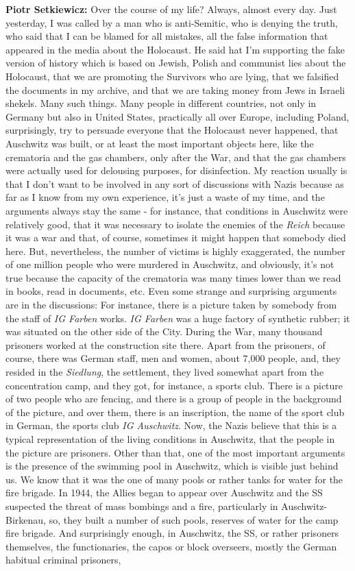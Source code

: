 \textbf{Piotr Setkiewicz:} Over the course of my life? Always, almost every day. Just yesterday, I was called by a man who is anti-Semitic, who is denying the truth, who said that I can be blamed for all mistakes, all the false information that appeared in the media about the Holocaust. He said hat I'm supporting the fake version of history which is based on Jewish, Polish and communist lies about the Holocaust, that we are promoting the Survivors who are lying, that we falsified the documents in my archive, and that we are taking money from Jews in Israeli shekels. Many such things. Many people in different countries, not only in Germany but also in United States, practically all over Europe, including Poland, surprisingly, try to persuade everyone that the Holocaust never happened, that Auschwitz was built, or at least the most important objects here, like the crematoria and the gas chambers, only after the War, and that the gas chambers were actually used for delousing purposes, for disinfection. My reaction usually is that I don't want to be involved in any sort of discussions with Nazis because as far as I know from my own experience, it's just a waste of my time, and the arguments always stay the same - for instance, that conditions in Auschwitz were relatively good, that it was necessary to isolate the enemies of the \textit{Reich} because it was a war and that, of course, sometimes it might happen that somebody died here. But, nevertheless, the number of victims is highly exaggerated, the number of one million people who were murdered in Auschwitz, and obviously, it's not true because the capacity of the crematoria was many times lower than we read in books, read in documents, etc. Even some strange and surprising arguments are in the discussions: For instance, there is a picture taken by somebody from the staff of \textit{IG Farben} works. \textit{IG Farben} was a huge factory of synthetic rubber; it was situated on the other side of the City. During the War, many thousand prisoners worked at the construction site there. Apart from the prisoners, of course, there was German staff, men and women, about 7,000 people, and, they resided in the \textit{Siedlung}, the settlement, they lived somewhat apart from the concentration camp, and they got, for instance, a sports club. There is a picture of two people who are fencing, and there is a group of people in the background of the picture, and over them, there is an inscription, the name of the sport club in German, the sports club \textit{IG Auschwitz}. Now, the Nazis believe that this is a typical representation of the living conditions in Auschwitz, that the people in the picture are prisoners. Other than that, one of the most important arguments is the presence of the swimming pool in Auschwitz, which is visible just behind us. We know that it was the one of many pools or rather tanks for water for the fire brigade. In 1944, the Allies began to appear over Auschwitz and the SS suspected the threat of mass bombings and a fire, particularly in Auschwitz-Birkenau, so, they built a number of such pools, reserves of water for the camp fire brigade. And surprisingly enough, in Auschwitz, the SS, or rather prisoners themselves, the functionaries, the capos or block overseers, mostly the German habitual criminal prisoners, 